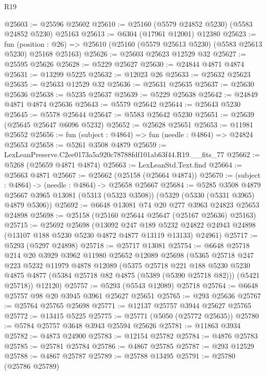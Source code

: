 \begin{lexlean}{R19}
\begin{coremodule}
@25603 := @25596 @25602
@25610 := @25160 (@5579 @24852 @5230) (@5583 @24852 @5230) @25163
@25613 := @6304 (@17961 @12001) @12380
@25623 := fun (position : @26) =>
  @25610 (@25160 (@5579 @25613 @5230) (@5583 @25613 @5230) @25168 @25163)
@25626 := @25603 @25623 @12529 @32
@25627 := @25595 @25626
@25628 := @5229 @25627
@25630 := @24844 @4871 @4874
@25631 := @13299 @5225
@25632 := @12023 @26
@25633 := @25632 @25623
@25635 := @25633 @12529 @32
@25636 := @25631 @25635
@25637 := @25630 @25636
@25638 := @5235 @25637
@25639 := @5229 @25638
@25642 := @24849 @4871 @4874 @25636
@25643 := @5579 @25642
@25644 := @25643 @5230
@25645 := @5578 @25644
@25647 := @5583 @25642 @5230
@25651 := @25639 (@25645 @25647 @6096 @5232)
@25652 := @25628 @25651
@25653 := @11981 @25652
@25656 := fun (subject : @4864) => fun (needle : @4864) => @24824 @25653
@25658 := @5261 @3508 @4879
@25659 := LexLeanPreserve.C2ee0173a5a920c78788fdf101ab63f44.R19.__fits_77
@25662 := @5268 (@25659 @4871 @4874)
@25663 := LexLeanStd.Text.find
@25664 := @25663 @4871
@25667 := @25662 (@25158 (@25664 @4874))
@25670 := (subject : @4864) -> (needle : @4864) -> @25658 @25667
@25684 := @5285
    @3508
    @4879
    @25667
    @3965
    @13081
    (@5313 (@5323 @3508))
    (@5329 (@5330 (@5331 @3965) @4879 @5306))
@25692 := @6648 @13081 @74 @20 @277 @3963 @24823 @25653 @24898
@25698 := @25158 (@25160 @25644 @25647 (@25167 @25636) @25163)
@25715 := @25692
    @25698
    (@13092
      @247
      @189
      @5232
      @24822
      @24943
      @24898
      (@13107 @188 @5230 @5230 @4872 @4877 @13119 @13133)
      @24961)
@25717 := @5293 (@5297 @24898)
@25718 := @25717 @13081
@25754 := @6648
    @25718
    @214
    @20
    @3929
    @3962
    @11980
    @25652
    @12089
    @25698
    (@5365
      @25718
      @247
      @223
      @5232
      @11979
      @4878
      @12089
      (@5375
        @25718
        @221
        @188
        @5230
        @5230
        @4875
        @4877
        (@5384 @25718 @82 @4875 (@5389 (@5390 @25718 @82)))
        (@5421 @25718))
      @12120)
@25757 := @5293 (@5543 @12089) @25718
@25764 := @6648 @25757 @98 @20 @3945 @3961 @25627 @25651
@25765 := @293 @25636
@25767 := @25764 @25765 @25698
@25771 := @12137 @25757 @3944 @25627 @25765
@25772 := @13415 @5225
@25775 := @25771 (@5050 (@25772 @25635))
@25780 := @5784 @25757 @3648 @3943 @25594 @25626
@25781 := @11863 @3934
@25782 := @4873 @24900
@25783 := @12154 @25782
@25784 := @4876 @25783
@25785 := @25781 @25784
@25786 := @4867 @25785
@25787 := @293 @12529
@25788 := @4867 @25787
@25789 := @25788 @13495
@25791 := @25780 (@25786 @25789)

\end{coremodule}
\end{lexlean}

